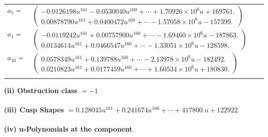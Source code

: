 \documentclass[1p]{elsarticle_modified}
\theoremstyle{definition}
\begin{document}
\begin{tabular}{m{7pt} m{180pt} m{7pt} m{180pt} }
\flushright $a_{5}=$&$\begin{pmatrix}-0.0126198 u^{161}-0.0530040 u^{160}+\cdots+1.70926\times10^{6} u+169761.\\0.00878790 u^{161}+0.0400472 u^{160}+\cdots-1.57058\times10^{6} u-157399.\end{pmatrix}$ \\
\flushright $a_{1}=$&$\begin{pmatrix}-0.0119242 u^{161}+0.00757900 u^{160}+\cdots-1.69460\times10^{6} u-187863.\\0.0134614 u^{161}+0.0466547 u^{160}+\cdots-1.33051\times10^{6} u-128598.\end{pmatrix}$ \\
\flushright $a_{10}=$&$\begin{pmatrix}0.0578349 u^{161}+0.139788 u^{160}+\cdots-2.13978\times10^{6} u-182492.\\0.0210823 u^{161}+0.0177459 u^{160}+\cdots+1.60534\times10^{6} u+180830.\end{pmatrix}$\\&\end{tabular}
\flushleft \textbf{(ii) Obstruction class $= -1$}\\~\\
\flushleft \textbf{(iii) Cusp Shapes $= 0.128045 u^{161}+0.241674 u^{160}+\cdots+417800. u+122922.$}\\~\\
\newpage\renewcommand{\arraystretch}{1}
\flushleft \textbf{(iv) u-Polynomials at the component}\newline \\
\end{document}
